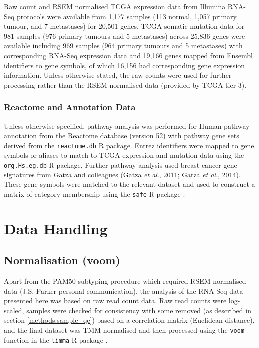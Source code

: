 Raw count and RSEM normalised TCGA expression data from Illumina RNA-Seq protocols were available from 1,177 samples (113 normal, 1,057 primary tumour, and 7 metastases) for 20,501 genes. TCGA somatic mutation data for 981 samples (976 primary tumours and 5 metastases) across 25,836 genes were available including 969 samples (964 primary tumours and 5 metastases) with corresponding RNA-Seq expression data and 19,166 genes mapped from Ensembl identifiers to gene symbols, of which 16,156 had corresponding gene expression information. Unless otherwise stated, the raw counts were used for further processing rather than the RSEM normalised data (provided by TCGA tier 3).

\subsubsection{Reactome and Annotation Data} \label{methods:gene_set}

Unless otherwise specified, pathway analysis was performed for Human pathway annotation from the Reactome database (version 52) with pathway gene sets derived from the \texttt{reactome.db} R package. Entrez identifiers were mapped to gene symbols or aliases to match to TCGA expression and mutation data using the \texttt{org.Hs.eg.db} R package. Further pathway analysis used breast cancer gene signatures from Gatza and colleagues (Gatza \textit{et al}., 2011; Gatza \textit{et al}., 2014). These gene symbols were matched to the relevant dataset and used to construct a matrix of category membership using the \texttt{safe} R package \citep{safe}.

\section{Data Handling}

\subsection{Normalisation (voom)}

Apart from the PAM50 subtyping procedure \citep{Parker2009} which required RSEM normalised data (J.S. Parker personal communication), the analysis of the RNA-Seq data presented here was based on raw read count data. Raw read counts were log-scaled, samples were checked for consistency with some removed (as described in section \ref{methods:sample_qc}) based on a correlation matrix (Euclidean distance), and the final dataset was TMM normalised \citep{Robinson2010} and then processed using the \texttt{voom} function \citep{Law2014} in the \texttt{limma} R package \citep{limma}.

